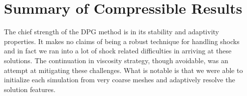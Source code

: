 \documentclass[Dissertation.tex]{subfiles}
\begin{document}
\section{Summary of Compressible Results}
The chief strength of the DPG method is in its stability and adaptivity properties.
It makes no claims of being a robust technique for handling shocks
and in fact we ran into a lot of shock related difficulties in arriving at these solutions.
The continuation in viscosity strategy, though avoidable, was an attempt at mitigating these challenges.
What is notable is that we were able to initialize each simulation from very coarse meshes
and adaptively resolve the solution features.
\end{document}
